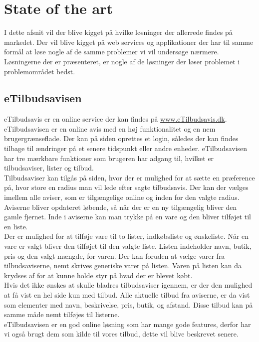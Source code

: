 \chapter{State of the art}
I dette afsnit vil der blive kigget på hvilke løsninger der allerrede findes på markedet.
Der vil blive kigget på web services og applikationer der har til samme formål at løse nogle af de samme problemer vi vil undersøge nærmere.
Løsningerne der er præsenteret, er nogle af de løsninger der løser problemet i problemområdet bedst. 
\section{eTilbudsavisen}
eTilbudsavis er en online service der kan findes på \underline{www.eTilbudsavis.dk}. eTilbudsavisen er en online avis med en høj funktionalitet og en nem brugergrænseflade.
Der kan på siden oprettes et login, således der kan findes tilbage til ændringer på et senere tidspunkt eller andre enheder.
eTilbudsavisen har tre mærkbare funktioner som brugeren har adgang til, hvilket er tilbudsaviser, lister og tilbud.\\
Tilbudsaviser kan tilgås på siden, hvor der er mulighed for at sætte en præference på, hvor store en radius man vil lede efter sagte tilbudsavis. 
Der kan der vælges imellem alle aviser, som er tilgængelige online og inden for den valgte radius. 
Aviserne bliver opdateret løbende, så når der er en ny tilgængelig bliver den gamle fjernet. 
Inde i aviserne kan man trykke på en vare og den bliver tilføjet til en liste.\\
Der er mulighed for at tilføje vare til to lister, indkøbsliste og ønskeliste. 
Når en vare er valgt bliver den tilføjet til den valgte liste.
Listen indeholder navn, butik, pris og den valgt mængde, for varen. 
Der kan foruden at vælge varer fra tilbudsaviserne, nemt skrives generiske varer på listen. Varen på listen kan da krydses af for at kunne holde styr på hvad der er blevet købt.\\ 
Hvis det ikke ønskes at skulle bladres tilbudsaviser igennem, er der den mulighed at få vist en hel side kun med tilbud. 
Alle aktuelle tilbud fra aviserne, er da vist som elementer med navn, beskrivelse, pris, butik, og afstand. Disse tilbud kan på samme måde nemt tilføjes til listerne.\\
eTilbudsavisen er en god online løsning som har mange gode features, derfor har vi også brugt dem som kilde til vores tilbud, dette vil blive beskrevet senere.
